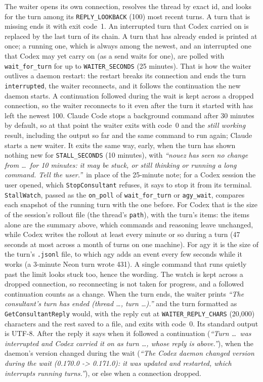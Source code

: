 \documentclass[10pt,a4paper]{article}
\newcommand{\code}[1]{\texttt{#1}}
\begin{document}
The waiter opens its own connection, resolves the thread by exact id, and looks for the turn among
its \code{REPLY\_LOOKBACK} (100) most recent turns. A turn that is missing ends it with exit
code~1. An interrupted turn that Codex carried on is replaced by the last turn of its chain. A
turn that has already ended is printed at once; a running one, which is always among the newest,
and an interrupted one that Codex may yet carry on (as a send waits for one), are polled with
\code{wait\_for\_turn} for up to \code{WAITER\_SECONDS} (25 minutes). That is how the waiter
outlives a daemon restart: the restart breaks its connection and ends the turn
\code{interrupted}, the waiter reconnects, and it follows the continuation the new daemon starts.
A continuation followed during the wait is kept across a dropped connection, so the waiter
reconnects to it even after the turn it started with has left the newest 100.
Claude Code stops a background command after 30 minutes by default, so at that point the waiter
exits with code~0 and the \emph{still working} result, including the output so far and the same
command to run again; Claude starts a new waiter. It exits the same way, early, when the turn has
shown nothing new for \code{STALL\_SECONDS} (10 minutes), with \emph{``nouez has seen no change
from \ldots\ for 10 minutes: it may be stuck, or still thinking or running a long command. Tell the
user.''}\ in place of the 25-minute note; for a Codex session the user opened, which
\code{StopConsultant} refuses, it says to stop it from its terminal. \code{StallWatch}, passed as
the \code{on\_poll} of \code{wait\_for\_turn} or \code{agy\_wait}, compares each snapshot of the
running turn with the one before. For Codex that is the size of the session's rollout file (the
thread's \code{path}), with the turn's items: the items alone are the summary above, which commands
and reasoning leave unchanged, while Codex writes the rollout at least every minute or so during a
turn (47 seconds at most across a month of turns on one machine). For agy it is the size of the turn's
\code{.jsonl} file, to which agy adds an event every few seconds while it works (a 3-minute Neon
turn wrote 431). A single command that runs quietly past the limit looks stuck too, hence the
wording. The watch is kept across a
dropped connection, so reconnecting is not taken for progress, and a followed continuation counts
as a change. When the turn ends, the waiter prints
\emph{``The consultant's turn has ended (thread \ldots, turn \ldots).''} and the turn formatted as
\code{GetConsultantReply} would, with the reply cut at \code{WAITER\_REPLY\_CHARS} (20,000)
characters and the rest saved to a file, and exits with code~0. Its standard output is UTF-8.
After the reply it says when it followed a continuation (\emph{``Turn \ldots\ was interrupted and
Codex carried it on as turn \ldots, whose reply is above.''}), when the daemon's version changed
during the wait (\emph{``The Codex daemon changed version during the wait (0.170.0 -> 0.171.0): it
was updated and restarted, which interrupts running turns.''}), or else when a connection dropped.
\end{document}
